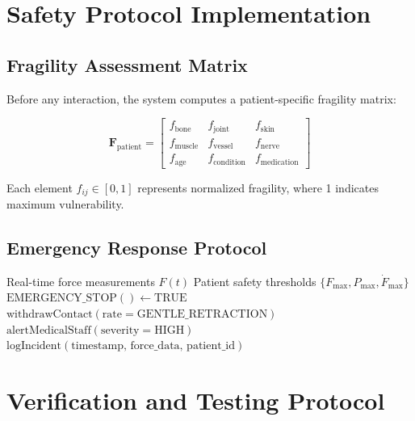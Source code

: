 \documentclass[11pt]{article}
\begin{document}
\section{Safety Protocol Implementation}

\subsection{Fragility Assessment Matrix}

Before any interaction, the system computes a patient-specific fragility matrix:

\begin{equation}
\mathbf{F}_{\text{patient}} = \begin{bmatrix}
f_{\text{bone}} & f_{\text{joint}} & f_{\text{skin}} \\
f_{\text{muscle}} & f_{\text{vessel}} & f_{\text{nerve}} \\
f_{\text{age}} & f_{\text{condition}} & f_{\text{medication}}
\end{bmatrix}
\end{equation}

Each element $f_{ij} \in [0,1]$ represents normalized fragility, where 1 indicates maximum vulnerability.

\subsection{Emergency Response Protocol}

\begin{algorithm}
\caption{Emergency Safety Override System}
\begin{algorithmic}[1]
\REQUIRE Real-time force measurements $F(t)$
\REQUIRE Patient safety thresholds $\{F_{\text{max}}, P_{\text{max}}, \dot{F}_{\text{max}}\}$
    \STATE $\text{EMERGENCY\_STOP}() \leftarrow \text{TRUE}$
    \STATE $\text{withdrawContact}(\text{rate} = \text{GENTLE\_RETRACTION})$
    \STATE $\text{alertMedicalStaff}(\text{severity} = \text{HIGH})$
    \STATE $\text{logIncident}(\text{timestamp, force\_data, patient\_id})$
\ENDIF
\end{algorithmic}
\end{algorithm}

\section{Verification and Testing Protocol}
\end{document}
